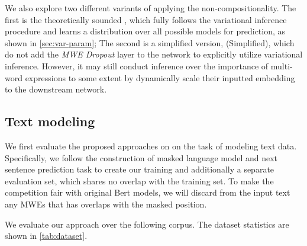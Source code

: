 We also 
explore two different variants of applying the non-compositionality.
The first is the theoretically sounded \BertMWE, which fully follows the variational inference procedure and learns a distribution over all possible models for prediction, as shown in \autoref{sec:var-param}; The second is a simplified version, 
 \BertMWE (Simplified), 
which do not add the \textit{MWE Dropout} layer to the network to explicitly utilize variational inference. 
However, it may still conduct inference over the importance of multi-word expressions to some extent by dynamically scale their inputted embedding to the downstream network.

\subsection{Text modeling} \label{sec:dataset}
We first evaluate the proposed approaches on on the task of modeling text data.
Specifically, we follow the construction of masked language model and next sentence prediction task \cite{devlin2018bert} to create our training and additionally a separate evaluation set, 
which shares no overlap with the training set. 
To make the competition fair with original Bert models, 
we will discard from the input text any MWEs that has overlaps with the masked position. 


We evaluate our approach over the following corpus. The dataset statistics are shown in \autoref{tab:dataset}. 


